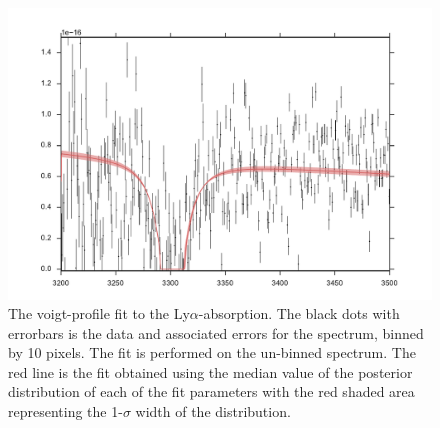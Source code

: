 \documentclass[a4paper,fleqn,usenatbib]{mnras}
\newcommand{\lya}{Ly$\alpha$}
\begin{document}
\begin{figure} %
	\includegraphics[width=\columnwidth]{figures/DLA_fit_zoom.pdf} \caption{The
		voigt-profile fit to the \lya-absorption. The black dots with errorbars is the
		data and associated errors for the spectrum, binned by 10 pixels. The fit is
		performed on the un-binned spectrum. The red line is the fit obtained using the
		median value of the posterior distribution of each of the fit parameters with
		the red shaded area representing the 1-$\sigma$ width of the distribution.}
	\label{fig:example_figure} \end{figure}
\end{document}
